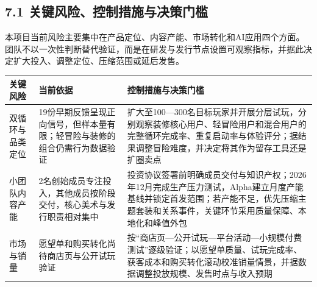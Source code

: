 \documentclass[UTF8,fontset=none,zihao=5,twoside]{ctexart}
\newcounter{none}
\newenvironment{BusinessTable}{%
  \begingroup
  \small
  \setlength{\parindent}{0pt}%
  \setlength{\parskip}{0pt}%
  \rowcolors{2}{TableAlt}{white}%
}{%
  \endgroup
}
\begin{document}
\subsection{7.1 关键风险、控制措施与决策门槛}\label{71-ux5173ux952eux98ceux9669ux63a7ux5236ux63aaux65bdux4e0eux51b3ux7b56ux95e8ux69db}

本项目当前风险主要集中在产品定位、内容产能、市场转化和AI应用四个方面。团队不以一次性判断替代验证，而是在研发与发行节点设置可观察指标，并据此决定扩大投入、调整定位、压缩范围或延后发售。

\begin{BusinessTable}

{\def\LTcaptype{none} %
\begin{longtable}[]{@{}
  >{\raggedright\arraybackslash}p{}
  >{\raggedright\arraybackslash}p{}
  >{\raggedright\arraybackslash}p{}@{}}
\toprule\noalign{}
\begin{minipage}[b]{\linewidth}\raggedright
\cellcolor{TableHeader}\color{BrandBlue}\bfseries 关键风险
\end{minipage} & \begin{minipage}[b]{\linewidth}\raggedright
\cellcolor{TableHeader}\color{BrandBlue}\bfseries 当前依据
\end{minipage} & \begin{minipage}[b]{\linewidth}\raggedright
\cellcolor{TableHeader}\color{BrandBlue}\bfseries 控制措施与决策门槛
\end{minipage} \\
\midrule\noalign{}
\endhead
\bottomrule\noalign{}
\endlastfoot
双循环与品类定位 & 19份早期反馈呈现正向信号，但样本量有限；轻冒险与装修的组合仍需行为数据验证 & 扩大至100---300名目标玩家并开展分层试玩，分别观察装修核心用户、轻冒险用户和混合用户的完整循环完成率、重复启动率与体验评分；据结果调整冒险难度，并决定将其作为留存工具还是扩圈卖点 \\
小团队内容产能 & 2名创始成员专注投入，其他成员按阶段交付，核心美术与发行职责相对集中 & 投资协议签署前明确成员交付与知识产权；2026年12月完成生产压力测试，Alpha建立月度产能基线并锁定首发范围；若产能不足，优先压缩主题套装和关系事件，关键环节采用质量保障、本地化和峰值外包 \\
市场与销量 & 愿望单和购买转化尚待商店页与公开试玩验证 & 按``商店页---公开试玩---平台活动---小规模付费测试''逐级验证；以愿望单质量、试玩完成率、获客成本和购买转化滚动校准销量情景，并据数据调整投放规模、发售时点与收入预期 \\

\end{longtable}}
\end{BusinessTable}
\end{document}
